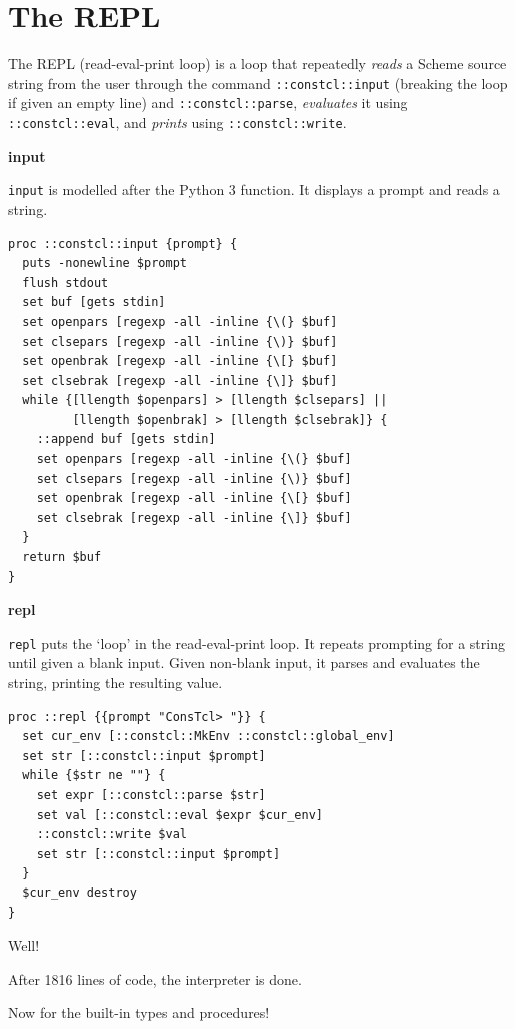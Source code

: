 \documentclass[a5paper,draft]{memoir}
\begin{document}
\chapter{The REPL}
\label{the-repl}

The REPL (read-eval-print loop) is a loop that repeatedly \emph{reads} a Scheme source string from the user through the command \texttt{::constcl::input} (breaking the loop if given an empty line) and \texttt{::constcl::parse}, \emph{evaluates} it using \texttt{::constcl::eval}, and \emph{prints} using \texttt{::constcl::write}.

\textbf{input}

\texttt{input} is modelled after the Python 3 function. It displays a prompt and reads a string.

\begin{lstlisting}
proc ::constcl::input {prompt} {
  puts -nonewline $prompt
  flush stdout
  set buf [gets stdin]
  set openpars [regexp -all -inline {\(} $buf]
  set clsepars [regexp -all -inline {\)} $buf]
  set openbrak [regexp -all -inline {\[} $buf]
  set clsebrak [regexp -all -inline {\]} $buf]
  while {[llength $openpars] > [llength $clsepars] ||
         [llength $openbrak] > [llength $clsebrak]} {
    ::append buf [gets stdin]
    set openpars [regexp -all -inline {\(} $buf]
    set clsepars [regexp -all -inline {\)} $buf]
    set openbrak [regexp -all -inline {\[} $buf]
    set clsebrak [regexp -all -inline {\]} $buf]
  }
  return $buf
}
\end{lstlisting}

\textbf{repl}

\texttt{repl} puts the `loop' in the read-eval-print loop. It repeats prompting for a string until given a blank input. Given non-blank input, it parses and evaluates the string, printing the resulting value.

\begin{lstlisting}
proc ::repl {{prompt "ConsTcl> "}} {
  set cur_env [::constcl::MkEnv ::constcl::global_env]
  set str [::constcl::input $prompt]
  while {$str ne ""} {
    set expr [::constcl::parse $str]
    set val [::constcl::eval $expr $cur_env]
    ::constcl::write $val
    set str [::constcl::input $prompt]
  }
  $cur_env destroy
}
\end{lstlisting}

Well!

After 1816 lines of code, the interpreter is done.

Now for the built-in types and procedures!
\end{document}

